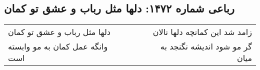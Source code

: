 \begin{center}
\section*{رباعی شماره ۱۴۷۲: دلها مثل رباب و عشق تو کمان}
\label{sec:1472}
\begin{longtable}{l p{0.5cm} r}
دلها مثل رباب و عشق تو کمان
&&
زامد شد این کمانچه دلها نالان
\\
وانگه عمل کمان به مو وابسته است
&&
گر مو شود اندیشه نگنجد به میان
\\
\end{longtable}
\end{center}
